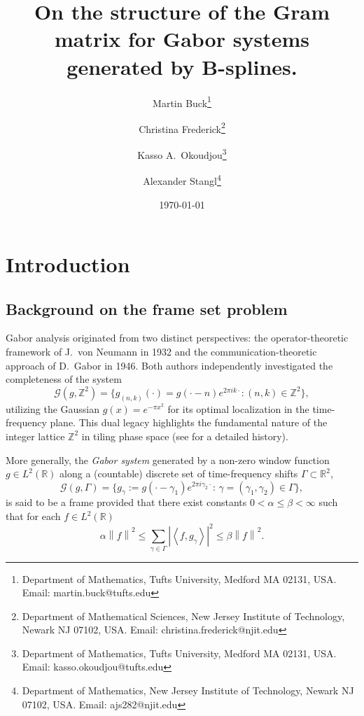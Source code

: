 \documentclass{article}
\title{On the structure of the Gram matrix for Gabor systems generated by B-splines.}
\date{\today}
\author{
Martin Buck\thanks{Department of Mathematics, Tufts University, Medford MA 02131, USA. Email: martin.buck@tufts.edu}
\and
Christina Frederick\thanks{Department of Mathematical Sciences, New Jersey Institute of Technology, Newark NJ 07102, USA. Email: christina.frederick@njit.edu}
\and
Kasso A.~Okoudjou\thanks{Department of Mathematics, Tufts University, Medford MA 02131, USA. Email: kasso.okoudjou@tufts.edu}
\and
Alexander Stangl\thanks{Department of Mathematics, New Jersey Institute of Technology, Newark NJ 07102, USA. Email: ajs282@njit.edu}
}
\newcommand{\R}{\mathbb{R}}
\newcommand{\norm}[1]{\ensuremath{\left\lVert#1\right\rVert}}
\newcommand{\abs}[1]{\ensuremath{\left\lvert#1\right\rvert}}
\newcommand{\ip}[1]{\ensuremath{\left\langle#1\right\rangle}}
\begin{document}
\maketitle







\section{Introduction}
\subsection{Background on the frame set problem}
Gabor analysis originated from two distinct perspectives: the operator-theoretic framework of J.~von Neumann \cite{MR66944} in 1932 and the communication-theoretic approach of D.~Gabor \cite{gabo1946} in 1946. Both authors independently investigated the completeness of the system 
\begin{equation}\label{gabgauss}
	\mathcal{G}(g,\mathbb{Z}^2) = \{g_{(n,k)}(\cdot) = g(\cdot - n) e^{2\pi ik \cdot} : (n,k) \in \mathbb{Z}^2\},
\end{equation}
utilizing the Gaussian $g(x)=e^{-\pi x^2}$ for its optimal localization in the time-frequency plane. This dual legacy highlights the fundamental nature of the integer lattice $\mathbb{Z}^2$ in tiling phase space (see \cite{heil2007history} for a detailed history).


More generally, the \textit{Gabor system} generated by a non-zero window function
\(g \in L^{2}(\R)\) along a (countable) discrete set of time-frequency shifts
\(\Gamma \subset \R^2\),
\begin{equation}\label{eq:Gabor_glambda}
	\mathcal{G}(g, \Gamma) = \{g_\gamma:=g(\cdot-\gamma_1) 
		e^{2\pi i\gamma_2\cdot}:\, \gamma=(\gamma_1,\gamma_2) \in \Gamma\},
\end{equation} is said to be a frame provided that there exist constants $0<\alpha\leq \beta < \infty$  such that for each \(f \in
L^2(\R)\)
\begin{equation}
	\alpha\norm{f}^2 \leq \sum_{\gamma \in \Gamma}
		\abs{\ip{f, g_{\gamma}}}^2 \leq \beta\norm{f}^2.
\end{equation}
\end{document}
